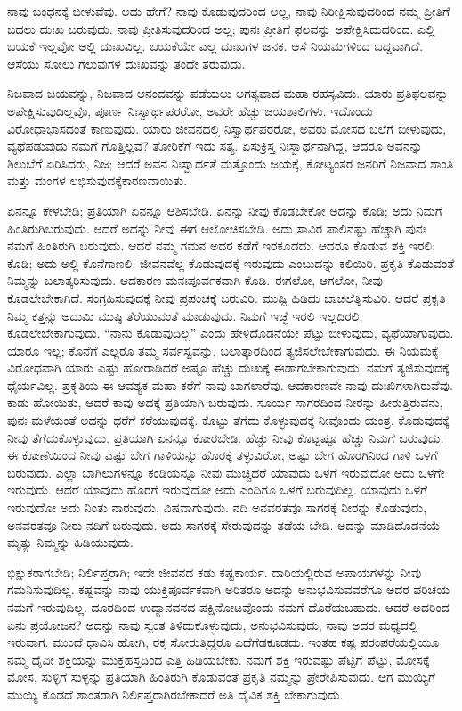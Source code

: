 ನಾವು ಬಂಧನಕ್ಕೆ ಬೀಳುವೆವು. ಅದು ಹೇಗೆ? ನಾವು ಕೊಡುವುದರಿಂದ ಅಲ್ಲ, ನಾವು ನಿರೀಕ್ಷಿಸುವುದರಿಂದ ನಮ್ಮ ಪ್ರೀತಿಗೆ ಬದಲು ದುಃಖ ಬರುವುದು. ನಾವು ಪ್ರೀತಿಸುವುದರಿಂದ ಅಲ್ಲ; ಪುನಃ ಪ್ರೀತಿಗೆ ಫಲವನ್ನು ಅಪೇಕ್ಷಿಸಿದುದರಿಂದ. ಎಲ್ಲಿ ಬಯಕೆ ಇಲ್ಲವೋ ಅಲ್ಲಿ ದುಃಖವಿಲ್ಲ. ಬಯಕೆಯೇ ಎಲ್ಲ ದುಃಖಗಳ ಜನಕ. ಆಸೆ ನಿಯಮಗಳಿಂದ ಬದ್ದವಾಗಿದೆ. ಆಸೆಯು ಸೋಲು ಗೆಲುವುಗಳ ದುಃಖವನ್ನು ತಂದೇ ತರುವುದು.

ನಿಜವಾದ ಜಯವನ್ನು, ನಿಜವಾದ ಆನಂದವನ್ನು ಪಡೆಯಲು ಅಗತ್ಯವಾದ ಮಹಾ ರಹಸ್ಯವಿದು. ಯಾರು ಪ್ರತಿಫಲವನ್ನು ಅಪೇಕ್ಷಿಸುವುದಿಲ್ಲವೊ, ಪೂರ್ಣ ನಿಃಸ್ವಾರ್ಥಪರರೋ, ಅವರೇ ಹೆಚ್ಚು ಜಯಶಾಲಿಗಳು. ಇದೊಂದು ವಿರೋಧಾಭಾಸದಂತೆ ಕಾಣುವುದು. ಯಾರು ಜೀವನದಲ್ಲಿ ನಿಸ್ವಾರ್ಥಪರರೋ, ಅವರು ಮೋಸದ ಬಲೆಗೆ ಬೀಳುವುದು, ವ್ಯಥೆಪಡುವುದು ನಮಗೆ ಗೊತ್ತಿಲ್ಲವೆ? ತೋರಿಕೆಗೆ ಇದು ಸತ್ಯ. ಏಸುಕ್ರಿಸ್ತ ನಿಃಸ್ವಾರ್ಥನಾಗಿದ್ದ, ಆದರೂ ಅವನನ್ನು ಶಿಲುಬೆಗೆ ಏರಿಸಿದರು, ನಿಜ; ಆದರೆ ಅವನ ನಿಃಸ್ವಾರ್ಥತೆ ಮತ್ತೊಂದು ಜಯಕ್ಕೆ, ಕೋಟ್ಯಂತರ ಜನರಿಗೆ ನಿಜವಾದ ಶಾಂತಿ ಮತ್ತು ಮಂಗಳ ಲಭಿಸುವುದಕ್ಕೆ\break ಕಾರಣವಾಯಿತು.

ಏನನ್ನೂ ಕೇಳಬೇಡಿ; ಪ್ರತಿಯಾಗಿ ಏನನ್ನೂ ಆಶಿಸಬೇಡಿ. ಏನನ್ನು ನೀವು ಕೊಡಬೇಕೋ ಅದನ್ನು ಕೊಡಿ; ಅದು ನಿಮಗೆ ಹಿಂತಿರುಗಿಬರುವುದು. ಆದರೆ ಅದನ್ನು ನೀವು ಈಗ ಆಲೋಚಿಸಬೇಡಿ. ಅದು ಸಾವಿರ ಪಾಲಿನಷ್ಟು ಹೆಚ್ಚಾಗಿ ಪುನಃ ನಮಗೆ ಹಿಂತಿರುಗಿ ಬರುವುದು. ಆದರೆ ನಮ್ಮ ಗಮನ ಅದರ ಕಡೆಗೆ ಇರಕೂಡದು. ಆದರೂ ಕೊಡುವ ಶಕ್ತಿ ಇರಲಿ; ಕೊಡಿ; ಅದು ಅಲ್ಲಿ ಕೊನೆಗಾಣಲಿ. ಜೀವನವೆಲ್ಲ ಕೊಡುವುದಕ್ಕೆ ಇರುವುದು ಎಂಬುದನ್ನು ಕಲಿಯಿರಿ. ಪ್ರಕೃತಿ ಕೊಡುವಂತೆ ನಿಮ್ಮನ್ನು ಬಲಾತ್ಕರಿಸುವುದು. ಆದಕಾರಣ ಮನಃಪೂರ್ವಕವಾಗಿ ಕೊಡಿ. ಈಗಲೋ, ಆಗಲೋ, ನೀವು ಕೊಡಲೇಬೇಕಾಗಿದೆ. ಸಂಗ್ರಹಿಸುವುದಕ್ಕೆ ನೀವು ಪ್ರಪಂಚಕ್ಕೆ ಬರುವಿರಿ. ಮುಷ್ಟಿ ಹಿಡಿದು ಬಾಚಲೆತ್ನಿಸುವಿರಿ. ಆದರೆ ಪ್ರಕೃತಿ ನಿಮ್ಮ ಕತ್ತನ್ನು ಅದುಮಿ ಮುಷ್ಠಿ ತೆರೆಯುವಂತೆ ಮಾಡುವುದು. ನಿಮಗೆ ಇಚ್ಛೆ ಇರಲಿ ಇಲ್ಲದಿರಲಿ, ಕೊಡಲೇಬೇಕಾಗುವುದು. “ನಾನು ಕೊಡುವುದಿಲ್ಲ” ಎಂದು ಹೇಳಿದೊಡನೆಯೇ ಪೆಟ್ಟು ಬೀಳುವುದು, ವ್ಯಥೆಯಾಗುವುದು. ಯಾರೂ ಇಲ್ಲ; ಕೊನೆಗೆ ಎಲ್ಲರೂ ತಮ್ಮ ಸರ್ವಸ್ವವನ್ನು, ಬಲಾತ್ಕಾರದಿಂದ ತ್ಯಜಿಸಲೇಬೇಕಾಗುವುದು. ಈ ನಿಯಮಕ್ಕೆ ವಿರೋಧವಾಗಿ ಯಾರು ಎಷ್ಟು ಹೋರಾಡಿದರೆ ಅಷ್ಟೂ ಹೆಚ್ಚು ದುಃಖಕ್ಕೆ ಈಡಾಗಬೇಕಾಗುವುದು. ನಮಗೆ ತ್ಯಜಿಸುವುದಕ್ಕೆ ಧೈರ್ಯವಿಲ್ಲ. ಪ್ರಕೃತಿಯ ಈ ಆವಶ್ಯಕ ಮಹಾ ಕರೆಗೆ ನಾವು ಬಾಗಲಾರೆವು. ಆದಕಾರಣವೇ ನಾವು ದುಃಖಿಗಳಾಗಿರುವೆವು. ಕಾಡು ಹೋಯಿತು, ಆದರೆ ಕಾವು ಅದಕ್ಕೆ ಪ್ರತಿಯಾಗಿ ಬರುವುದು. ಸೂರ್ಯ ಸಾಗರದಿಂದ ನೀರನ್ನು ಹೀರುತ್ತಿರುವನು, ಪುನಃ ಮಳೆಯಂತೆ ಅದನ್ನು ಧರೆಗೆ ಕರೆಯುವುದಕ್ಕೆ. ಕೊಟ್ಟು ತೆಗೆದು ಕೊಳ್ಳುವುದಕ್ಕೆ ನೀವೊಂದು ಯಂತ್ರ. ಕೊಡುವುದಕ್ಕೆ ನೀವು ತೆಗೆದುಕೊಳ್ಳುವುದು. ಪ್ರತಿಯಾಗಿ ಏನನ್ನೂ ಕೋರಬೇಡಿ. ಹೆಚ್ಚು ನೀವು ಕೊಟ್ಟಷ್ಟೂ ಹೆಚ್ಚು ನಿಮಗೆ ಬರುವುದು. ಈ ಕೋಣೆಯಿಂದ ನೀವು ಎಷ್ಟು ಬೇಗ ಗಾಳಿಯನ್ನು ಹೊರಕ್ಕೆ ತಳ್ಳುವಿರೋ, ಅಷ್ಟು ಬೇಗ ಹೊರಗಿನಿಂದ ಗಾಳಿ ಒಳಗೆ ಬರುವುದು. ಎಲ್ಲಾ ಬಾಗಿಲುಗಳನ್ನೂ ಕಂಡಿಯನ್ನೂ ನೀವು ಮುಚ್ಚಿದರೆ ಯಾವುದು ಒಳಗೆ ಇರುವುದೋ ಅದು ಒಳಗೇ ಇರುವುದು. ಆದರೆ ಯಾವುದು ಹೊರಗೆ ಇರುವುದೋ ಅದು ಎಂದಿಗೂ ಒಳಗೆ ಬರುವುದಿಲ್ಲ. ಯಾವುದು ಒಳಗೆ ಇರುವುದೋ ಅದು ನಿಂತು ನಾರುವುದು, ವಿಷವಾಗುವುದು. ನದಿ ಅನವರತವೂ ಸಾಗರಕ್ಕೆ ನೀರನ್ನು ಕೊಡುವುದು, ಅನವರತವೂ ನೀರು ನದಿಗೆ ಬರುವುದು. ಅದು ಸಾಗರಕ್ಕೆ ಸೇರುವುದನ್ನು ತಡೆಯ ಬೇಡಿ. ಅದನ್ನು ಮಾಡಿದೊಡನೆಯೆ ಮೃತ್ಯು ನಿಮ್ಮನ್ನು ಹಿಡಿಯುವುದು.

ಭಿಕ್ಷುಕರಾಗಬೇಡಿ; ನಿರ್ಲಿಪ್ತರಾಗಿ; ಇದೇ ಜೀವನದ ಕಡು ಕಷ್ಟಕಾರ್ಯ. ದಾರಿಯಲ್ಲಿರುವ ಅಪಾಯಗಳನ್ನು ನೀವು ಗಮನಿಸುವುದಿಲ್ಲ. ಕಷ್ಟವನ್ನು ನಾವು ಯುಕ್ತಿಪೂರ್ವಕವಾಗಿ ಅರಿತರೂ ಅದನ್ನು ಅನುಭವಿಸುವವರೆಗೂ ಅದರ ಪರಿಚಯ ನಮಗೆ ಇರುವುದಿಲ್ಲ. ದೂರದಿಂದ ಉದ್ಯಾನವನದ ಪಕ್ಷಿನೋಟವೊಂದು ನಮಗೆ ದೊರೆಯಬಹುದು. ಆದರೆ ಅದರಿಂದ ಏನು ಪ್ರಯೋಜನ? ಅದನ್ನು ನಾವು ಸ್ವಂತ ತಿಳಿದುಕೊಳ್ಳುವುದು, ಅನುಭವಿಸುವುದು, ನಾವು ಅದರ ಮಧ್ಯದಲ್ಲಿ ಇರುವಾಗ. ಮುಂದೆ ಧಾವಿಸಿ ಹೋಗಿ, ರಕ್ತ ಸೋರುತ್ತಿದ್ದರೂ ಎದೆಗೆಡಕೂಡದು. ಇಂತಹ ಕಷ್ಟ ಪರಂಪರೆಯಲ್ಲಿಯೂ ನಮ್ಮ ದೈವೀ ಶಕ್ತಿಯನ್ನು ಮುಕ್ತಹಸ್ತದಿಂದ ಎತ್ತಿ ಹಿಡಿಯಬೇಕು. ನಮಗೆ ಶಕ್ತಿ ಇರುವಷ್ಟು ಪೆಟ್ಟಿಗೆ ಪೆಟ್ಟು, ಮೋಸಕ್ಕೆ ಮೋಸ, ಸುಳ್ಳಿಗೆ ಸುಳ್ಳನ್ನು ಪ್ರತಿಯಾಗಿ ಹಿಂತಿರುಗಿ ಕೊಡುವಂತೆ ಪ್ರಕೃತಿ ನಮ್ಮನ್ನು ಪ್ರೇರೇಪಿಸುವುದು. ಆಗ ಮುಯ್ಯಿಗೆ ಮುಯ್ಯಿ ಕೊಡದೆ ಶಾಂತರಾಗಿ ನಿರ್ಲಿಪ್ತರಾಗಿರಬೇಕಾದರೆ ಅತಿ ದೈವಿಕ ಶಕ್ತಿ ಬೇಕಾಗುವುದು.

